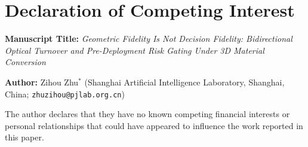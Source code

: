 \documentclass[11pt,a4paper]{article}
\begin{document}
\section*{Declaration of Competing Interest}

\textbf{Manuscript Title:} \textit{Geometric Fidelity Is Not Decision Fidelity: Bidirectional Optical Turnover and Pre-Deployment Risk Gating Under 3D Material Conversion}

\medskip
\noindent\textbf{Author:} Zihou Zhu$^{\ast}$ (Shanghai Artificial Intelligence Laboratory, Shanghai, China; \texttt{zhuzihou@pjlab.org.cn})

\bigskip
\noindent The author declares that they have no known competing financial interests or personal relationships that could have appeared to influence the work reported in this paper.
\end{document}
